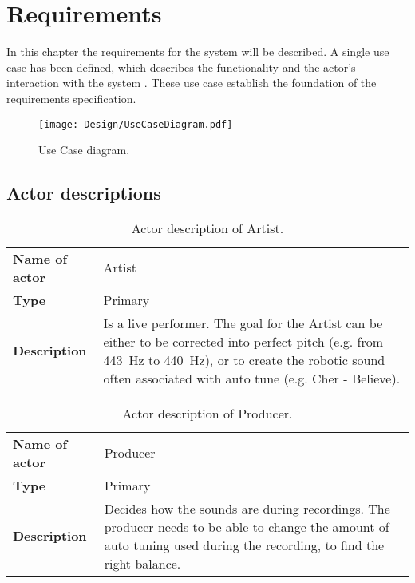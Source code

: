 
\chapter{Requirements}

In this chapter the requirements for the system will be described.
A single use case has been defined, which describes the functionality and the actor's interaction with the system \systemName.
These use case establish the foundation of the requirements specification.

\begin{figure}[H]
	\centering
	\texttt{[image: Design/UseCaseDiagram.pdf]}
	\caption{Use Case diagram.}
	\label{fig:UCDiagram}
\end{figure}

\section{Actor descriptions}

\begin{table}[H]
	\centering
	\begin{tabularx}{\textwidth}{p{} X}
		\toprule
		\textbf{Name of actor} & Artist \\
		\textbf{Type} & Primary \\
		\textbf{Description} & Is a live performer.
		The goal for the Artist can be either to be corrected into perfect pitch (e.g. from \SI{443}{\hertz} to \SI{440}{\hertz}), or to create the robotic sound often associated with auto tune (e.g. Cher - Believe). \\
		\bottomrule
	\end{tabularx}
	\caption{Actor description of Artist.}
	\label{tab:actorArtist}
\end{table}

\begin{table}[H]
	\centering
	\begin{tabularx}{\textwidth}{p{} X}
		\toprule
		\textbf{Name of actor} & Producer \\
		\textbf{Type} & Primary \\
		\textbf{Description} & Decides how the sounds are during recordings. The producer needs to be able to change the amount of auto tuning used during the recording, to find the right balance. \\
		\bottomrule
	\end{tabularx}
	\caption{Actor description of Producer.}
	\label{tab:actorProducer}
\end{table}

